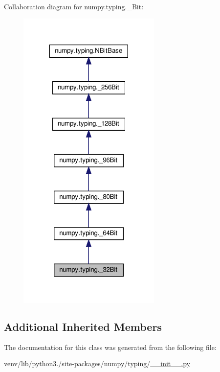 Collaboration diagram for numpy.\+typing.\+\_\+Bit\+:
\nopagebreak
\begin{figure}[H]
\begin{center}
\leavevmode
\includegraphics[width=200pt]{classnumpy_1_1typing_1_1__32Bit__coll__graph}
\end{center}
\end{figure}
\subsection*{Additional Inherited Members}


The documentation for this class was generated from the following file\+:\begin{DoxyCompactItemize}
\item 
venv/lib/python3./site-\/packages/numpy/typing/\hyperlink{venv_2lib_2python3_89_2site-packages_2numpy_2typing_2____init_____8py}{\+\_\+\+\_\+init\+\_\+\+\_\+.\+py}\end{DoxyCompactItemize}
